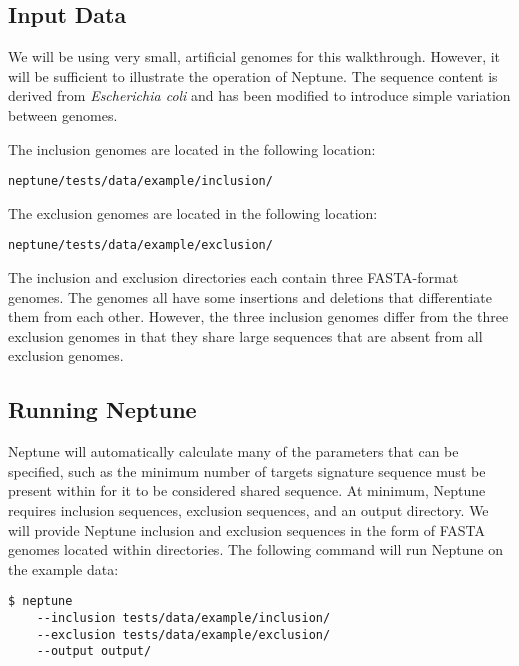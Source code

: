 \documentclass[a4paper,10pt]{article}
\begin{document}
\subsection{Input Data}

We will be using very small, artificial genomes for this walkthrough. However, it will be sufficient to illustrate the operation of Neptune. The sequence content is derived from \textit{Escherichia coli} and has been modified to introduce simple variation between genomes.

The inclusion genomes are located in the following location:

\begin{minipage}{\linewidth}
\begin{lstlisting}[frame=single, style=bash]
neptune/tests/data/example/inclusion/
\end{lstlisting}
\end{minipage}

The exclusion genomes are located in the following location:

\begin{minipage}{\linewidth}
\begin{lstlisting}[frame=single, style=bash]
neptune/tests/data/example/exclusion/
\end{lstlisting}
\end{minipage}

The inclusion and exclusion directories each contain three FASTA-format genomes. The genomes all have some insertions and deletions that differentiate them from each other. However, the three inclusion genomes differ from the three exclusion genomes in that they share large sequences that are absent from all exclusion genomes.

\subsection{Running Neptune}

Neptune will automatically calculate many of the parameters that can be specified, such as the minimum number of targets signature sequence must be present within for it to be considered shared sequence. At minimum, Neptune requires inclusion sequences, exclusion sequences, and an output directory. We will provide Neptune inclusion and exclusion sequences in the form of FASTA genomes located within directories. The following command will run Neptune on the example data:

\begin{minipage}{\linewidth}
\begin{lstlisting}[frame=single, style=bash]
$ neptune
    --inclusion tests/data/example/inclusion/
    --exclusion tests/data/example/exclusion/
    --output output/
\end{lstlisting}
\end{minipage}
\end{document}
